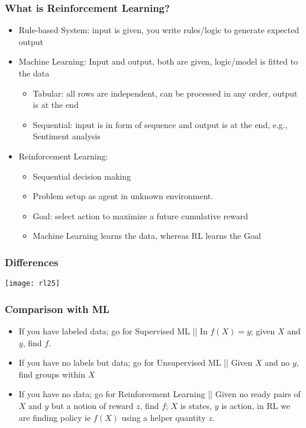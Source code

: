 \begin{frame}[fragile]\frametitle{What is Reinforcement Learning?}

\begin{itemize}
\item Rule-based System: input is given, you write rules/logic to generate expected output
\item Machine Learning: Input and output, both are given, logic/model is fitted to the data
	\begin{itemize}
	\item Tabular: all rows are independent, can be processed in any order, output is at the end
	\item Sequential: input is in form of sequence and output is at the end, e.g., Sentiment analysis
	\end{itemize}
\item Reinforcement Learning: 
	\begin{itemize}
	\item Sequential decision making 
	\item Problem setup as agent in unknown environment. 
	\item Goal: select action to maximize a future cumulative reward
	\item Machine Learning learns the data, whereas RL learns the Goal
	\end{itemize}
\end{itemize}

\end{frame}

\begin{frame}[fragile]\frametitle{Differences}
\begin{center}
\texttt{[image: rl25]}
\end{center}
\end{frame}

\begin{frame}[fragile]\frametitle{Comparison with ML}

\begin{itemize}
\item If you have labeled data; go for Supervised ML || In $f(X) = y$; given $X$ and $y$,  find $f$.
\item If you have no labels but data; go for Unsupervised ML || Given $X$ and no $y$,  find groups within $X$
\item If you have no data; go for Reinforcement Learning || Given no ready pairs of $X$ and $y$ but a notion of reward $z$, find $f$; $X$ is states, $y$ is action, in RL we are finding policy ie $f(X)$ using a helper quantity $z$.
\end{itemize}


\end{frame}



